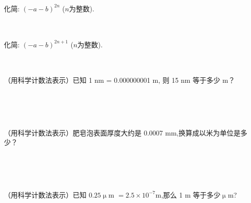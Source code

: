 \\ \\ \\
\item{
    化简: $(-a-b)^{2n}$ ($n$为整数).
}
\\ \\ \\
\item{
    化简: $(-a-b)^{2n+1}$ ($n$为整数).
}
\\ \\ \\
\item{
    （用科学计数法表示）已知 1 nm = 0.000000001 m, 则 15 nm 等于多少 m？
    \iffalse
    \fangsong\zihao{4}
    解答: 

    \textcircled{1} 写出换算关系
    \begin{align*}
        1 \rm{nm} &= 10^{-9} \rm{m}
    \end{align*}
    \textcircled{2} 两边同时乘15
    \begin{align*}
        15 \rm{nm} &= 15 \times 10^{-9} \rm{m}\\
        &= 1.5\times 10^{-8} \rm{m}.
    \end{align*}
    \fi
}
\\ \\ \\
\item{
    （用科学计数法表示）肥皂泡表面厚度大约是 0.0007 mm,换算成以米为单位是多少？
    \iffalse
    \fangsong\zihao{4}
    解答: 

    \textcircled{1} 写出换算关系
    \begin{align*}
        1 \rm{mm} &= 10^{-3} \rm{m}
    \end{align*}
    \textcircled{2} 两边同时乘0.0007
    \begin{align*}
        0.0007 \rm{mm} &= 0.0007 \times 10^{-3} \rm{m}\\
        &= 7\times 10^{-7} \rm{m}.
    \end{align*}
    \fi
}
\\ \\ \\
\item{
    （用科学计数法表示）已知 $0.25 \upmu$m $ = 2.5\times 10^{-7}$m,那么 1 m 等于多少$\upmu$m?
    \iffalse
    \fangsong\zihao{4}
    思路: 将题中给出的换算关系两边同时除以 $2.5\times 10^{-7}$,右边就出现了 1m.

    解答: 
    \begin{align*}
        \frac{0.25}{2.5\times 10^{-7}} \rm{\upmu m} &= 1\rm{m}\\
        10^6 \rm{\upmu m} &= 1\rm{m}\\
        1\rm{m} &= 10^6 \rm{\upmu m}.
    \end{align*}
    \fi
}

